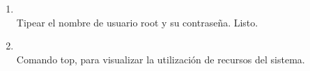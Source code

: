 \documentclass[11pt]{article}
\begin{document}
\begin{enumerate}
		   	\item 
		   		\begin{minipage}[t]{\linewidth}
			        \raggedright
			        \medskip
			        \\Tipear el nombre de usuario root y su contraseña. Listo. 
		        \end{minipage}	

		    \item 
		    	\begin{minipage}[t]{\linewidth}
			        \raggedright
			        \medskip
			        \\Comando top, para visualizar la utilización de recursos del sistema. 
		        \end{minipage}
		\end{enumerate}
\end{document}

